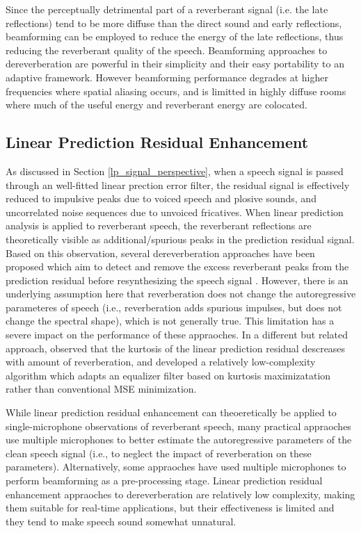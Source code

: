Since the perceptually detrimental part of a reverberant signal (i.e. the late reflections) tend to be more diffuse than the direct sound and early reflections, beamforming can be employed to reduce the energy of the late reflections, thus reducing the reverberant quality of the speech. Beamforming approaches to dereverberation are powerful in their simplicity and their easy portability to an adaptive framework. However beamforming performance degrades at higher frequencies where spatial aliasing occurs, and is limitted in highly diffuse rooms where much of the useful energy and reverberant energy are colocated.


\subsection{Linear Prediction Residual Enhancement}

As discussed in Section \ref{lp_signal_perspective}, when a speech signal is passed through an well-fitted linear prection error filter, the residual signal is effectively reduced to impulsive peaks due to voiced speech and plosive sounds, and uncorrelated noise sequences due to unvoiced fricatives. When linear prediction analysis is applied to reverberant speech, the reverberant reflections are theoretically visible as additional/spurious peaks in the prediction residual signal. Based on this observation, several dereverberation approaches have been proposed which aim to detect and remove the excess reverberant peaks from the prediction residual before resynthesizing the speech signal \citep{yegnanarayana2002enhancement, thomas2007practical}.  However, there is an underlying assumption here that reverberation does not change the autoregressive parameteres of speech (i.e., reverberation adds spurious impulses, but does not change the spectral shape), which is not generally true. This limitation has a severe impact on the performance of these appraoches. In a different but related approach, \cite{gillespie2001speech} observed that the kurtosis of the linear prediction residual descreases with amount of reverberation, and developed a relatively low-complexity algorithm which adapts an equalizer filter based on kurtosis maximizatation rather than conventional MSE minimization.

While linear prediction residual enhancement can theoeretically be applied to single-microphone observations of reverberant speech, many practical appraoches use multiple microphones to better estimate the autoregressive parameters of the clean speech signal (i.e., to neglect the impact of reverberation on these parameters). Alternatively, some appraoches have used multiple microphones to perform beamforming as a pre-processing stage. Linear prediction residual enhancement appraoches to dereverberation are relatively low complexity, making them suitable for real-time applications, but their effectiveness is limited and they tend to make speech sound somewhat unnatural. 

